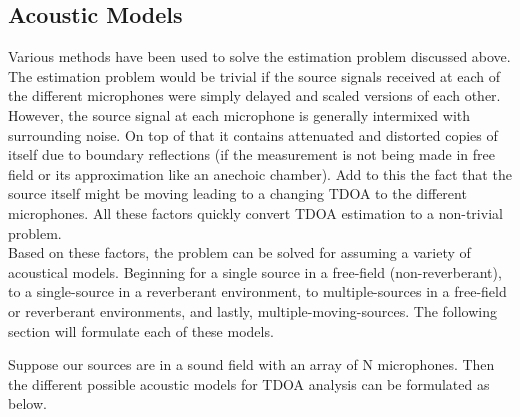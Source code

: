 \subsection{Acoustic Models}

Various methods have been used \cite{benesty2008microphone} to solve the estimation problem discussed above. The estimation problem would be trivial if the source signals received at each of the different microphones were simply delayed and scaled versions of each other. However, the source signal at each microphone is generally intermixed with surrounding noise. On top of that it contains attenuated and distorted copies of itself due to boundary reflections (if the measurement is not being made in free field or its approximation like an anechoic chamber). Add to this the fact that the source itself might be moving leading to a changing TDOA to the different microphones. All these factors quickly convert TDOA estimation to a non-trivial problem. \\
Based on these factors, the problem can be solved for assuming a variety of acoustical models. Beginning for a single source in a free-field (non-reverberant), to a single-source in a reverberant environment, to multiple-sources in a free-field or reverberant environments, and lastly, multiple-moving-sources. The following section will formulate each of these models.

Suppose our sources are in a sound field with an array of N microphones. Then the different possible acoustic models for TDOA analysis can be formulated as below.

